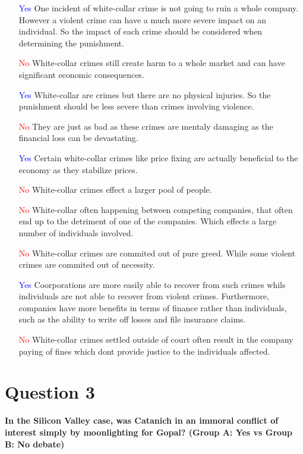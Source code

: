 \documentclass[12pt]{article}
\begin{document}
\begin{itemize}
    \item [\textcolor{blue}{Yes}] One incident of white-collar crime is not going to ruin a whole company. However a violent crime can have a much more severe impact on an individual. So the impact of each crime should be considered when determining the punishment.
    \item [\textcolor{red}{No}] White-collar crimes still create harm to a whole market and can have significant economic consequences.
    \item [\textcolor{blue}{Yes}] White-collar are crimes but there are no physical injuries. So the punishment should be less severe than crimes involving violence.
    \item [\textcolor{red}{No}] They are just as bad as these crimes are mentaly damaging as the financial loss can be devastating.
    \item [\textcolor{blue}{Yes}] Certain white-collar crimes like price fixing are actually beneficial to the economy as they stabilize prices.
    \item [\textcolor{red}{No}] White-collar crimes effect a larger pool of people.
    \item [\textcolor{red}{No}] White-collar often happening between competing companies, that often end up to the detriment of one of the companies. Which effects a large number of individuals involved. 
    \item [\textcolor{red}{No}] White-collar crimes are commited out of pure greed. While some violent crimes are commited out of necessity.
    \item [\textcolor{blue}{Yes}] Coorporations are more easily able to recover from such crimes whils individuals are not able to recover from violent crimes. Furthermore, companies have more benefits in terms of finance rather than individuals, such as the ability to write off losses and file insurance claims.
    \item [\textcolor{red}{No}] White-collar crimes settled outside of court often result in the company paying of fines which dont provide justice to the individuals affected.
\end{itemize}

\section*{Question 3}
\textbf{In the Silicon Valley case, was Catanich in an immoral conflict of interest simply by moonlighting for Gopal? (Group A: Yes vs Group B: No debate)}
\end{document}
